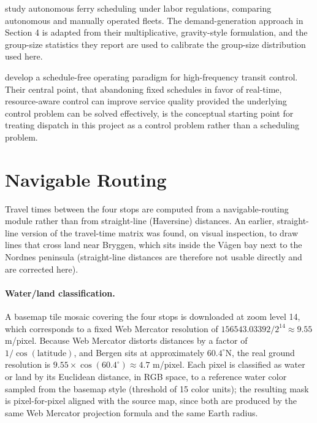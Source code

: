 \documentclass[11pt,a4paper]{article}
\begin{document}
\citet{Braathen2024} study autonomous ferry scheduling under labor regulations, comparing autonomous and manually operated fleets. The demand-generation approach in Section 4 is adapted from their multiplicative, gravity-style formulation, and the group-size statistics they report are used to calibrate the group-size distribution used here.

\citet{SanchezMartinez2017} develop a schedule-free operating paradigm for high-frequency transit control. Their central point, that abandoning fixed schedules in favor of real-time, resource-aware control can improve service quality provided the underlying control problem can be solved effectively, is the conceptual starting point for treating dispatch in this project as a control problem rather than a scheduling problem.

\section{Navigable Routing}

Travel times between the four stops are computed from a navigable-routing module rather than from straight-line (Haversine) distances. An earlier, straight-line version of the travel-time matrix was found, on visual inspection, to draw lines that cross land near Bryggen, which sits inside the Vågen bay next to the Nordnes peninsula (straight-line distances are therefore not usable directly and are corrected here).

\paragraph{Water/land classification.} A basemap tile mosaic covering the four stops is downloaded at zoom level 14, which corresponds to a fixed Web Mercator resolution of $156543.03392 / 2^{14} \approx 9.55$ m/pixel. Because Web Mercator distorts distances by a factor of $1/\cos(\text{latitude})$, and Bergen sits at approximately $60.4^{\circ}$N, the real ground resolution is $9.55 \times \cos(60.4^{\circ}) \approx 4.7$ m/pixel. Each pixel is classified as water or land by its Euclidean distance, in RGB space, to a reference water color sampled from the basemap style (threshold of 15 color units); the resulting mask is pixel-for-pixel aligned with the source map, since both are produced by the same Web Mercator projection formula and the same Earth radius.
\end{document}
